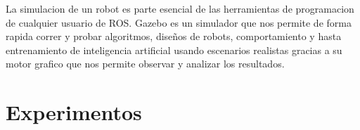 \documentclass[journal]{IEEEtran}
\begin{document}
La simulacion de un robot es parte esencial de las herramientas de programacion de cualquier usuario de ROS. Gazebo es un simulador que nos permite de forma rapida correr y probar algoritmos, diseños de robots, comportamiento y hasta entrenamiento de inteligencia artificial usando escenarios realistas gracias a su motor grafico que nos permite observar y analizar los resultados.

\section{Experimentos}


%
%



%
%
\end{document}
